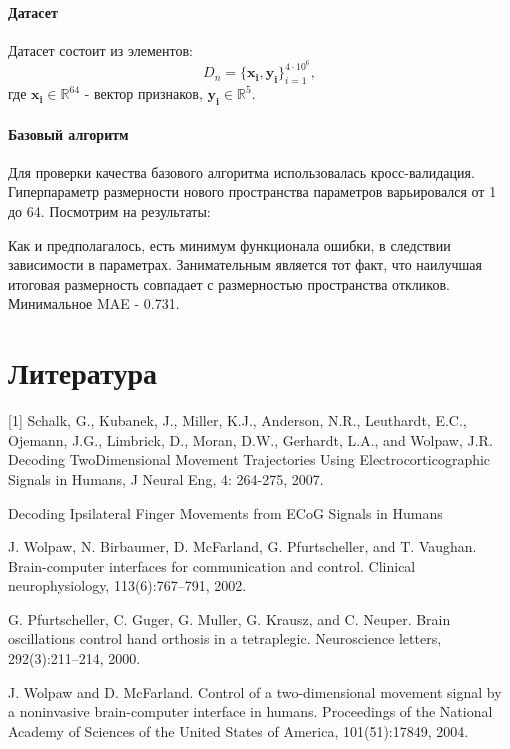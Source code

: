 \documentclass[12pt,twoside]{article}
\begin{document}
 \paragraph{Датасет}
 Датасет состоит из элементов:
$$D_n = \{\pmb{x_i}, \pmb{y_i}\}^{4\cdot10^6}_{i=1},$$
где $\pmb{x_i} \in \mathbb{R}^{64}$ - вектор признаков, $\pmb{y_i} \in \mathbb{R}^5$.

\paragraph{Базовый алгоритм}
Для проверки качества базового алгоритма использовалась кросс-валидация. Гиперпараметр размерности нового пространства параметров варьировался от 1 до 64. Посмотрим на результаты:  
\begin{figure}[h]
    \begin{minipage}[h]{1\linewidth}
    \end{minipage}
\label{fg:Example}
\end{figure}
\par
Как и предполагалось, есть минимум функционала ошибки, в следствии зависимости в параметрах. Занимательным является тот факт, что наилучшая итоговая размерность совпадает с размерностью пространства откликов. Минимальное MAE - 0.731.

\section{Литература}
[1] Schalk, G., Kubanek, J., Miller, K.J., Anderson, N.R., Leuthardt, E.C., Ojemann, J.G., Limbrick, D., Moran, D.W., Gerhardt, L.A., and Wolpaw, J.R. Decoding TwoDimensional Movement Trajectories Using Electrocorticographic Signals in Humans, J Neural Eng, 4: 264-275, 2007. \par
[2] Decoding Ipsilateral Finger Movements from ECoG Signals in Humans \par
[3] J. Wolpaw, N. Birbaumer, D. McFarland, G. Pfurtscheller, and T. Vaughan. Brain-computer interfaces for communication and control. Clinical neurophysiology, 113(6):767–791, 2002. \par 
[4] G. Pfurtscheller, C. Guger, G. Muller, G. Krausz, and C. Neuper. Brain oscillations control hand orthosis in a tetraplegic. Neuroscience letters, 292(3):211–214, 2000. \par
[5] J. Wolpaw and D. McFarland. Control of a two-dimensional movement signal by a noninvasive brain-computer interface in humans. Proceedings of the National Academy of Sciences of the United States of America, 101(51):17849, 2004.
\end{document}
